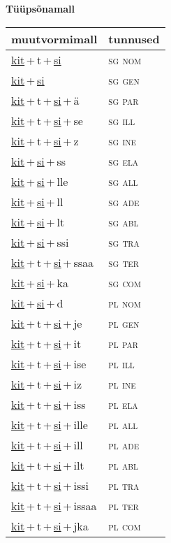
\vspace{1.8em}
\begin{minipage}{\textwidth}
\textbf{Tüüpsõnamall \,}\\

\begin{sideways}
\begin{tabular}{l l}
muutvormimall & tunnused \\
\hline
\underline{kit}\,+\,t\,+\,\underline{si} & \textsc{ sg nom } \\
\underline{kit}\,+\,\underline{si} & \textsc{ sg gen } \\
\underline{kit}\,+\,t\,+\,\underline{si}\,+\,ä & \textsc{ sg par } \\
\underline{kit}\,+\,t\,+\,\underline{si}\,+\,se & \textsc{ sg ill } \\
\underline{kit}\,+\,t\,+\,\underline{si}\,+\,z & \textsc{ sg ine } \\
\underline{kit}\,+\,\underline{si}\,+\,ss & \textsc{ sg ela } \\
\underline{kit}\,+\,\underline{si}\,+\,lle & \textsc{ sg all } \\
\underline{kit}\,+\,\underline{si}\,+\,ll & \textsc{ sg ade } \\
\underline{kit}\,+\,\underline{si}\,+\,lt & \textsc{ sg abl } \\
\underline{kit}\,+\,\underline{si}\,+\,ssi & \textsc{ sg tra } \\
\underline{kit}\,+\,t\,+\,\underline{si}\,+\,ssaa & \textsc{ sg ter } \\
\underline{kit}\,+\,\underline{si}\,+\,ka & \textsc{ sg com } \\
\underline{kit}\,+\,\underline{si}\,+\,d & \textsc{ pl nom } \\
\underline{kit}\,+\,t\,+\,\underline{si}\,+\,je & \textsc{ pl gen } \\
\underline{kit}\,+\,t\,+\,\underline{si}\,+\,it & \textsc{ pl par } \\
\underline{kit}\,+\,t\,+\,\underline{si}\,+\,ise & \textsc{ pl ill } \\
\underline{kit}\,+\,t\,+\,\underline{si}\,+\,iz & \textsc{ pl ine } \\
\underline{kit}\,+\,t\,+\,\underline{si}\,+\,iss & \textsc{ pl ela } \\
\underline{kit}\,+\,t\,+\,\underline{si}\,+\,ille & \textsc{ pl all } \\
\underline{kit}\,+\,t\,+\,\underline{si}\,+\,ill & \textsc{ pl ade } \\
\underline{kit}\,+\,t\,+\,\underline{si}\,+\,ilt & \textsc{ pl abl } \\
\underline{kit}\,+\,t\,+\,\underline{si}\,+\,issi & \textsc{ pl tra } \\
\underline{kit}\,+\,t\,+\,\underline{si}\,+\,issaa & \textsc{ pl ter } \\
\underline{kit}\,+\,t\,+\,\underline{si}\,+\,jka & \textsc{ pl com } \\
\end{tabular}
\end{sideways}
\label{tab:tüüpsõnamall-kittsi}


\end{minipage}
